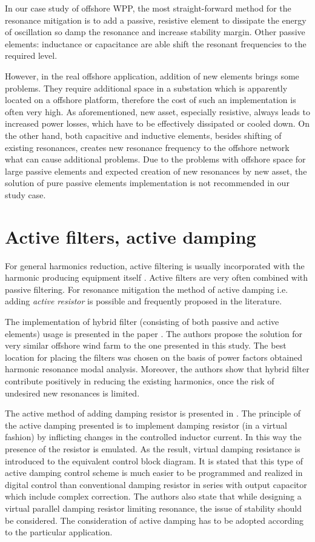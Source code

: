 \documentclass[12pt]{report} %
\begin{document}
In our case study of offshore WPP, the most straight-forward method for the resonance mitigation is to add a passive, resistive element to dissipate the energy of oscillation so damp the resonance and increase stability margin. Other passive elements: inductance or capacitance are able shift the resonant frequencies to the required level.

However, in the real offshore application, addition of new elements brings some problems. They require additional space in a substation which is apparently located on a offshore platform, therefore the cost of such an implementation is often very high. As aforementioned, new asset, especially resistive, always leads to increased power losses, which have to be effectively dissipated or cooled down. On the other hand, both capacitive and inductive elements, besides shifting of existing resonances, creates new resonance frequency to the offshore network what can cause additional problems. Due to the problems with offshore space for large passive elements and expected creation of new resonances by new asset, the solution of pure passive elements implementation is not recommended in our study case.

\section{Active filters, active damping}
For general harmonics reduction, active filtering is usually incorporated with the harmonic producing equipment itself \cite{das}. Active filters are very often combined with passive filtering. For resonance mitigation the method of active damping i.e. adding \textit{active resistor} is possible and frequently proposed in the literature.

The implementation of hybrid filter (consisting of both passive and active elements) usage is presented in the paper \cite{hasan2014}. The authors propose the solution for very similar offshore wind farm to the one presented in this study. The best location for placing the filters was chosen on the basis of power factors obtained harmonic resonance modal analysis. Moreover, the authors show that hybrid filter contribute positively in reducing the existing harmonics, once the risk of undesired new resonances is limited.

The active method of adding damping resistor is presented in \cite{chen2012}. The principle of the active damping presented is to implement damping resistor (in a virtual fashion) by inflicting changes in the controlled inductor current. In this way the presence of the resistor is emulated. As the result, virtual damping resistance is introduced  to the equivalent control block diagram. It is stated that this type of active damping control scheme is much easier to be programmed and realized in digital control than conventional damping resistor in series with output capacitor which include complex correction. 
The authors also state that while designing a virtual parallel damping resistor limiting resonance, the issue of stability should be considered. The consideration of active damping has to be adopted according to the particular application.
\end{document}
